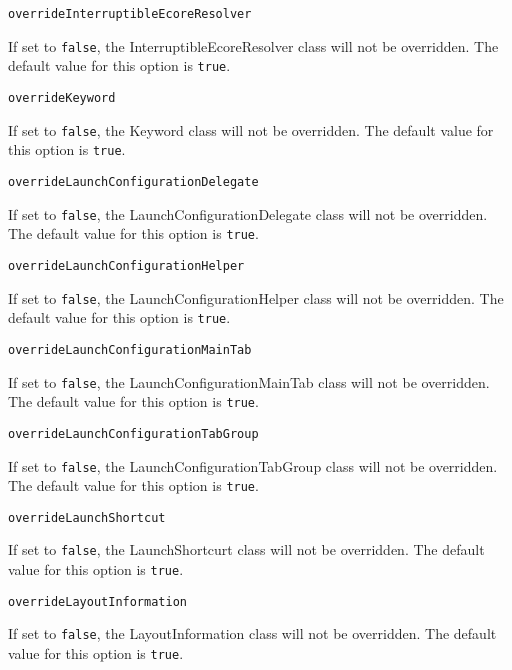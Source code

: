 \noindent\texttt{overrideInterruptibleEcoreResolver}
\begin{myindentpar}{1cm}
If set to \texttt{false}, the InterruptibleEcoreResolver class will not be overridden. The default value for this option is \texttt{true}.
\end{myindentpar}

\noindent\texttt{overrideKeyword}
\begin{myindentpar}{1cm}
If set to \texttt{false}, the Keyword class will not be overridden. The default value for this option is \texttt{true}.
\end{myindentpar}

\noindent\texttt{overrideLaunchConfigurationDelegate}
\begin{myindentpar}{1cm}
If set to \texttt{false}, the LaunchConfigurationDelegate class will not be overridden. The default value for this option is \texttt{true}.
\end{myindentpar}

\noindent\texttt{overrideLaunchConfigurationHelper}
\begin{myindentpar}{1cm}
If set to \texttt{false}, the LaunchConfigurationHelper class will not be overridden. The default value for this option is \texttt{true}.
\end{myindentpar}

\noindent\texttt{overrideLaunchConfigurationMainTab}
\begin{myindentpar}{1cm}
If set to \texttt{false}, the LaunchConfigurationMainTab class will not be overridden. The default value for this option is \texttt{true}.
\end{myindentpar}

\noindent\texttt{overrideLaunchConfigurationTabGroup}
\begin{myindentpar}{1cm}
If set to \texttt{false}, the LaunchConfigurationTabGroup class will not be overridden. The default value for this option is \texttt{true}.
\end{myindentpar}

\noindent\texttt{overrideLaunchShortcut}
\begin{myindentpar}{1cm}
If set to \texttt{false}, the LaunchShortcurt class will not be overridden. The default value for this option is \texttt{true}.
\end{myindentpar}

\noindent\texttt{overrideLayoutInformation}
\begin{myindentpar}{1cm}
If set to \texttt{false}, the LayoutInformation class will not be overridden. The default value for this option is \texttt{true}.
\end{myindentpar}


